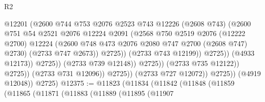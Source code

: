 \begin{lexlean}{R2}
\begin{coremodule}
                                            @12201
                                            (@2600
                                              @744
                                              @753
                                              @2076
                                              @2523
                                              @743
                                              @12226
                                              (@2608 @743)
                                              (@2600
                                                @751
                                                @54
                                                @2521
                                                @2076
                                                @12224
                                                @2091
                                                (@2568
                                                  @750
                                                  @2519
                                                  @2076
                                                  (@12222 @2700)
                                                  @12224
                                                  (@2600
                                                    @748
                                                    @473
                                                    @2076
                                                    @2080
                                                    @747
                                                    @2700
                                                    (@2608 @747)
                                                    @2730)
                                                  (@2733 @747 @2673))
                                                @2725))
                                            (@2733 @743 @12199))
                                          @2725))
                                      (@4933 @12173))
                                    @2725))
                                (@2733 @739 @12148))
                              @2725))
                          (@2733 @735 @12122))
                        @2725))
                    (@2733 @731 @12096))
                  @2725))
              (@2733 @727 @12072))
            @2725))
        (@4919 @12048))
      @2725)
@12375 := @11823
    (@11834
      (@11842
        (@11848
          (@11859
            (@11865
              (@11871
                (@11883
                  (@11889
                    (@11895
                      (@11907

\end{coremodule}
\end{lexlean}
